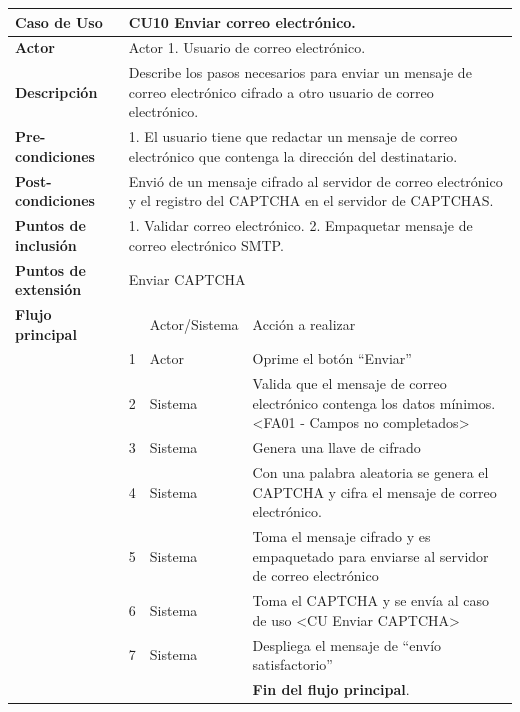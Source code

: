 \begin{table}[H]
 \centering
   {
     \begin{tabular}{| p{} | p{} |p{4cm}|p{5cm}|}
     \hline
     \textbf{Caso de Uso} &\multicolumn{3}{|l|}{CU10 Enviar correo electrónico.}\\
     \hline
     \textbf{Actor} & \multicolumn{3}{|l|}{Actor 1. Usuario de correo electrónico.}\\
     \hline
     \textbf{Descripción} & \multicolumn{3}{|p{10cm}|}{Describe los pasos necesarios para enviar un mensaje de correo electrónico cifrado a otro usuario de correo electrónico.}\\
     \hline
     \textbf{Pre-condiciones} & \multicolumn{3}{|p{10cm}|}{1. El usuario tiene que redactar un mensaje de correo electrónico que contenga la dirección del destinatario.}\\
     \hline
     \textbf{Post-condiciones} & \multicolumn{3}{|p{10cm}|}{Envió de un mensaje cifrado al servidor de correo electrónico y el registro del CAPTCHA en el servidor de CAPTCHAS.}\\
     \hline
     \textbf{Puntos de inclusión} & \multicolumn{3}{|p{10cm}|}{1. Validar correo electrónico. 2. Empaquetar mensaje de correo electrónico SMTP.}\\
     \hline
     \textbf{Puntos de extensión} & \multicolumn{3}{|l|}{Enviar CAPTCHA}\\
     \hline
     \textbf{Flujo principal} & & Actor/Sistema & Acción a realizar\\
     \hline
     & 1 & Actor & Oprime el botón ``Enviar''\\
     \hline
     & 2 & Sistema & Valida que el mensaje de correo electrónico contenga los datos mínimos.<FA01 - Campos no completados>\\
     \hline
     & 3 & Sistema & Genera una llave de cifrado\\
     \hline
     & 4 & Sistema & Con una palabra aleatoria se genera el CAPTCHA y cifra el mensaje de correo electrónico.\\
     \hline
     & 5 & Sistema & Toma el mensaje cifrado y es empaquetado para enviarse al servidor de correo electrónico\\
     \hline
     & 6 & Sistema & Toma el CAPTCHA  y se envía al caso de uso <CU Enviar CAPTCHA>\\
     \hline
     & 7 & Sistema & Despliega el mensaje de ``envío satisfactorio''\\
     \hline
     & & & \textbf{Fin del flujo principal}.\\

\end{tabular}}
\end{table}
